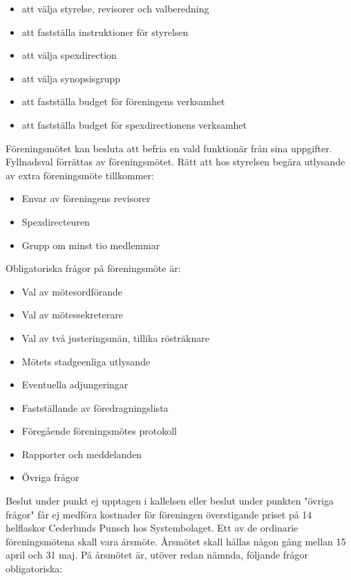 \documentclass[a4paper]{article}
\begin{document}
\begin{itemize}
  \item att välja styrelse, revisorer och valberedning
  \item att fastställa instruktioner för styrelsen
  \item att välja spexdirection
  \item att välja synopsisgrupp
  \item att fastställa budget för föreningens verksamhet
  \item att fastställa budget för spexdirectionens verksamhet
\end{itemize}

\noindent
Föreningsmötet kan besluta att befria en vald funktionär från sina uppgifter. Fyllnadsval förrättas av föreningsmötet.\newline
\newline
Rätt att hos styrelsen begära utlysande av extra föreningsmöte tillkommer:

\begin{itemize}
  \item Envar av föreningens revisorer
  \item Spexdirecteuren
  \item Grupp om minst tio medlemmar
\end{itemize}

\noindent
Obligatoriska frågor på föreningsmöte är:

\begin{itemize}
  \item Val av mötesordförande
  \item Val av mötessekreterare
  \item Val av två justeringsmän, tillika rösträknare
  \item Mötets stadgeenliga utlysande
  \item Eventuella adjungeringar
  \item Fastställande av föredragningslista
  \item Föregående föreningsmötes protokoll
  \item Rapporter och meddelanden
  \item Övriga frågor
\end{itemize}

Beslut under punkt ej upptagen i kallelsen eller beslut under punkten "övriga frågor" får ej medföra kostnader för föreningen överstigande priset på 14 helflaskor Cederlunds Punsch hos Systembolaget.\newline
\newline
Ett av de ordinarie föreningsmötena skall vara årsmöte. Årsmötet skall hållas någon gång mellan 15 april och 31 maj.\newline
\newline
På årsmötet är, utöver redan nämnda, följande frågor obligatoriska:
\end{document}

